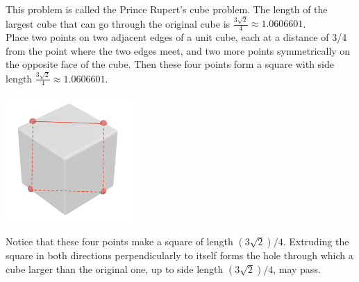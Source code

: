 \begin{solution}
This problem is called the Prince Rupert's cube problem. The length of the largest cube that can go through the original cube is $\frac{3\sqrt{2}}{4} \approx 1.0606601$.\\[0.2cm]

Place two points on two adjacent edges of a unit cube, each at a distance of 3/4 from the point where the two edges meet, and two more points symmetrically on the opposite face of the cube. Then these four points form a square with side length
$\frac{3\sqrt{2}}{4} \approx 1.0606601.$

\begin{center}
	\includegraphics[width=5cm]{51/figs/51_sol1.png}
\end{center}

Notice that these four points make a square of length $(3\sqrt{2})/4$. Extruding the square in both directions perpendicularly to itself forms the hole through which a cube larger than the original one, up to side length $(3\sqrt{2})/4$, may pass.

\end{solution}